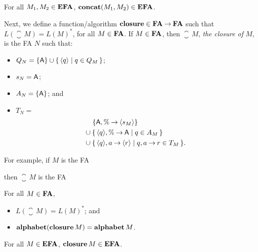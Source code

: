 \begin{proposition}
For all $M_1,M_2\in\mathbf{EFA}$, $\mathbf{concat}(M_1,M_2)\in\mathbf{EFA}$.
\end{proposition}

%
%
%
%
Next, we define a function/algorithm $\mathbf{closure}\in\mathbf{FA}\mathbin{\to}\mathbf{FA}$ such that
$L(\closure\,M)=L(M)^*$, for all $M\in\mathbf{FA}$.  If $M\in\mathbf{FA}$, then
$\closure\,M$, \emph{the closure of} $M$, is the FA $N$ such that:
\begin{itemize}
\item $Q_N=\{\mathsf{A}\}\cup\{ \, \langle q\rangle \mid q\in Q_M \, \}$;

\item $s_N=\mathsf{A}$;

\item $A_N=\{\mathsf{A}\}$; and

\item $T_N={}$
  \begin{align*}
    &\quad\, \{\mathsf{A},\%\mathbin{\to}\langle s_M\rangle\} \\
    &\cup \{ \, \langle q\rangle,\%\mathbin{\to}\mathsf{A} \mid q\in A_M \, \} \\
    &\cup \{ \, \langle q\rangle,a\mathbin{\to}\langle r\rangle \mid q,a\mathbin{\to} r\in
      T_M \, \}.
  \end{align*}
\end{itemize}

For example, if $M$ is the FA
\begin{center}

\end{center}
then $\closure\,M$ is the FA
\begin{center}

\end{center}

\begin{proposition}
For all $M\in\mathbf{FA}$,
\begin{itemize}
\item $L(\closure\,M)=L(M)^*$; and

\item $\mathbf{alphabet}(\mathbf{closure}\,M)=\mathbf{alphabet}\,M$.
\end{itemize}
\end{proposition}

\begin{proposition}
For all $M\in\mathbf{EFA}$, $\mathbf{closure}\,M\in\mathbf{EFA}$.
\end{proposition}

